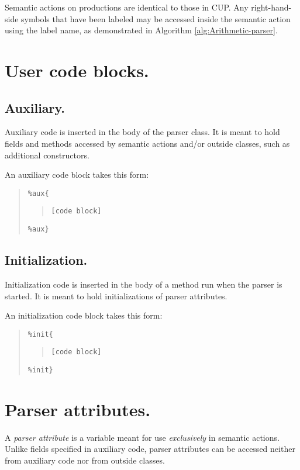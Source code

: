 \documentclass[12pt,english,twoside]{report}
\begin{document}
Semantic actions on productions are identical to those in CUP. Any
right-hand-side symbols that have been labeled may be accessed inside
the semantic action using the label name, as demonstrated in Algorithm
\ref{alg:Arithmetic-parser}.


\section{User code blocks.}


\subsection{Auxiliary.}

Auxiliary code is inserted in the body of the parser class. It is
meant to hold fields and methods accessed by semantic actions and/or
outside classes, such as additional constructors.

An auxiliary code block takes this form:

\begin{quote}
\texttt{\%aux\{}
\begin{quote}
\texttt{{[}code block]}
\end{quote}
\texttt{\%aux\}}
\end{quote}

\subsection{Initialization.}

Initialization code is inserted in the body of a method run when the
parser is started. It is meant to hold initializations of parser attributes.

An initialization code block takes this form:

\begin{quote}
\texttt{\%init\{}
\begin{quote}
\texttt{{[}code block]}
\end{quote}
\texttt{\%init\}}
\end{quote}

\section{Parser attributes.}

A \emph{parser attribute} is a variable meant for use \emph{exclusively}
in semantic actions. Unlike fields specified in auxiliary code, parser
attributes can be accessed neither from auxiliary code nor from outside
classes.
\end{document}
